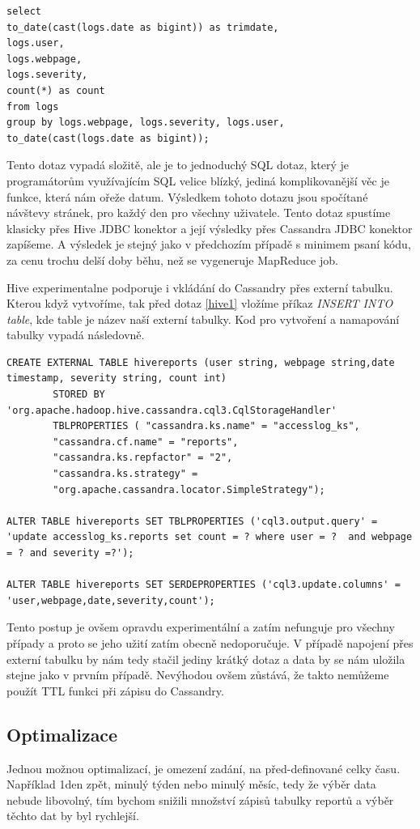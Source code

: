 \documentclass[thesis=M,czech]{FITthesis}[2012/06/26]
\begin{document}
\begin{lstlisting}[caption={Tabulka pro ukládání reportů},label=Hive1]
select 
to_date(cast(logs.date as bigint)) as trimdate,
logs.user,
logs.webpage,
logs.severity, 
count(*) as count
from logs 
group by logs.webpage, logs.severity, logs.user,
to_date(cast(logs.date as bigint));
\end{lstlisting}

Tento dotaz vypadá složitě, ale je to jednoduchý SQL dotaz, který je programátorům využívajícím SQL velice blízký, jediná komplikovanější věc je funkce, která nám ořeže datum. Výsledkem tohoto dotazu jsou spočítané návštevy stránek, pro každý den pro všechny uživatele. Tento dotaz spustíme klasicky přes Hive JDBC konektor a její výsledky přes Cassandra JDBC konektor zapíšeme. A výsledek je stejný jako v předchozím případě s minimem psaní kódu, za cenu trochu delší doby běhu, než se vygeneruje MapReduce job. 

Hive experimentalne podporuje i vkládání do Cassandry přes externí tabulku. Kterou když vytvoříme, tak před dotaz \ref{hive1} vložíme příkaz \emph{INSERT INTO table}, kde table je název naší externí tabulky. Kod pro vytvoření a namapování tabulky vypadá následovně. 
\begin{lstlisting}[caption={Vytvoření externí tabulky napojené na tabulku v CQL},label=Hive2]
CREATE EXTERNAL TABLE hivereports (user string, webpage string,date timestamp, severity string, count int)
        STORED BY 'org.apache.hadoop.hive.cassandra.cql3.CqlStorageHandler'
        TBLPROPERTIES ( "cassandra.ks.name" = "accesslog_ks",
        "cassandra.cf.name" = "reports",
        "cassandra.ks.repfactor" = "2",
        "cassandra.ks.strategy" =
        "org.apache.cassandra.locator.SimpleStrategy");
		
ALTER TABLE hivereports SET TBLPROPERTIES ('cql3.output.query' = 'update accesslog_ks.reports set count = ? where user = ?  and webpage = ? and severity =?');
		
ALTER TABLE hivereports SET SERDEPROPERTIES ('cql3.update.columns' = 'user,webpage,date,severity,count');
\end{lstlisting}
Tento postup je ovšem opravdu experimentální a zatím nefunguje pro všechny případy a proto se jeho užití zatím obecně nedoporučuje. V případě napojení přes externí tabulku by nám tedy stačil jediny krátký dotaz a data by se nám uložila stejne jako v prvním případě. Nevýhodou ovšem zůstává, že takto nemůžeme použít TTL funkci při zápisu do Cassandry.

\subsection{Optimalizace}
Jednou možnou optimalizací, je omezení zadání, na před-definované celky času. Například 1den zpět, minulý týden nebo minulý měsíc, tedy že výběr data nebude libovolný, tím bychom snižili množství zápisů tabulky reportů a výběr těchto dat by byl rychlejší. 
\end{document}
